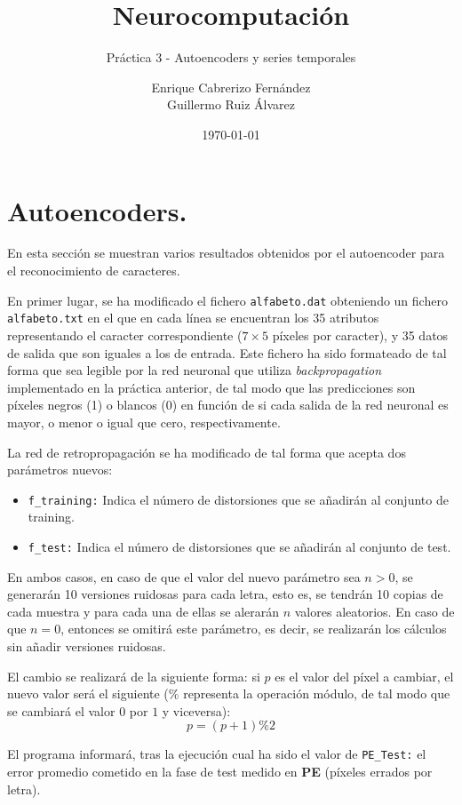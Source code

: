 \documentclass[spanish]{assignment}
\title{Neurocomputación}
\subtitle{Práctica 3 - Autoencoders y series temporales}
\author{Enrique Cabrerizo Fernández\\ Guillermo Ruiz Álvarez}
\date{\today}
\begin{document}
	\makepre
	\section{Autoencoders.}
	En esta sección se muestran varios resultados obtenidos por el autoencoder para el reconocimiento de caracteres. 
	
	En primer lugar, se ha modificado el fichero \texttt{alfabeto.dat} obteniendo un fichero \texttt{alfabeto.txt} en el que en cada línea se encuentran los 35 atributos representando el caracter correspondiente ($7\times 5$ píxeles por caracter), y 35 datos de salida que son iguales a los de entrada. Este fichero ha sido formateado de tal forma que sea legible por la red neuronal que utiliza \textit{backpropagation} implementado en la práctica anterior, de tal modo que las predicciones son píxeles negros (1) o blancos (0) en función de si cada salida de la red neuronal es mayor, o menor o igual que cero, respectivamente.
	
	La red de retropropagación se ha modificado de tal forma que acepta dos parámetros nuevos:
	\begin{itemize}
		\item \texttt{f\_training:} Indica el número de distorsiones que se añadirán al conjunto de training. 
		\item \texttt{f\_test:} Indica el número de distorsiones que se añadirán al conjunto de test.
	\end{itemize}
	
	En ambos casos, en caso de que el valor del nuevo parámetro sea $n>0$, se generarán 10 versiones ruidosas para cada letra, esto es, se tendrán 10 copias de cada muestra y para cada una de ellas se alerarán $n$ valores aleatorios. En caso de que $n=0$, entonces se omitirá este parámetro, es decir, se realizarán los cálculos sin añadir versiones ruidosas.
	
	El cambio se realizará de la siguiente forma: si $p$ es el valor del píxel a cambiar, el nuevo valor será el siguiente ($\%$ representa la operación módulo, de tal modo que se cambiará el valor $0$ por $1$ y viceversa): $$p = (p + 1) \% 2$$ 
	
	El programa informará, tras la ejecución cual ha sido el valor de \texttt{PE\_Test:} el error promedio cometido en la fase de test medido en \textbf{PE} (píxeles errados por letra).
	
\end{document}
